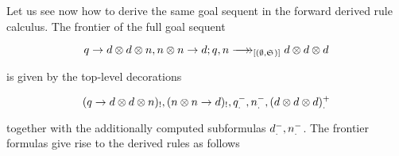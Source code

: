 \begin{example}
Let us see now how to derive the same goal sequent in the forward derived rule
calculus. The frontier of the full goal sequent

\[
  \zfneuseq{q \rightarrow d\otimes d\otimes n, n \otimes n \rightarrow d}{q,n}{[(\emptyset,\ctrlset{})]}
  {d \otimes d \otimes d}
\]

is given by the top-level decorations

\[
  (q \rightarrow d \otimes d \otimes n)_!,
  (n \otimes n \rightarrow d)_!,
  q_.^-, n_.^-,
  (d \otimes d \otimes d)_.^+
\]

together with the additionally computed subformulas
$d_.^-, n_.^-$. The frontier
formulas give rise to the derived rules as follows

\end{example}
